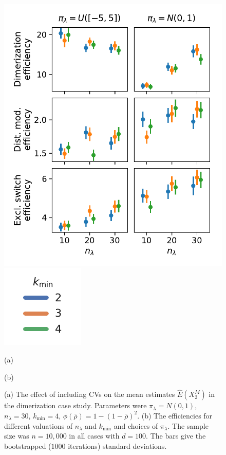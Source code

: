 \begin{figure}[t]
\begin{minipage}{.5\textwidth}
    \centering
    \includegraphics[scale=.4]{gfx/efficiency_priors.pdf}
    \end{minipage}
    \hspace{-2em}
    \begin{minipage}{0.12\textwidth}
    \includegraphics[scale=.5]{gfx/legend.pdf}
    \end{minipage}
    \begin{minipage}{.3\textwidth}
    \hspace{2.8cm}(a)
    \end{minipage}
    \begin{minipage}{.69\textwidth}
    \centering(b)
    \end{minipage}
	\caption[\ac{CV} illustration and the influence of algorithmic parameters]{(a) The effect of including \acp{CV} on the mean estimates
    $\hat{E}(X^M_2)$ in the dimerization case study. Parameters
    were ${\pi}_{\lambda}=N(0,1)$, ${n}_{\lambda}=30$, ${k}_{\min}=4$, $\phi(\bar\rho)=1-{(1 - \bar\rho)}^2$.
    (b) The efficiencies for different valuations of ${n}_{\lambda}$ and ${k}_{\min} $
    and choices of ${\pi}_{\lambda}$. The sample size was $n=10,\!000$ in all cases
    with $d=100$.
    The bars give the 
    bootstrapped ($1000$ iterations)
    standard deviations.}
    \label{fig:efficiencies_prior}
\end{figure}

